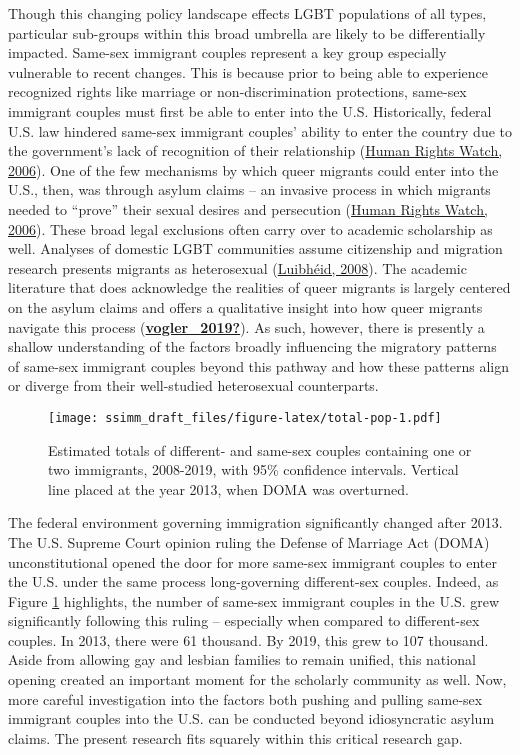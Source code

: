 \documentclass[
  11pt,
]{article}
\begin{document}
Though this changing policy landscape effects LGBT populations of all types, particular sub-groups within this broad umbrella are likely to be differentially impacted. Same-sex immigrant couples represent a key group especially vulnerable to recent changes. This is because prior to being able to experience recognized rights like marriage or non-discrimination protections, same-sex immigrant couples must first be able to enter into the U.S. Historically, federal U.S. law hindered same-sex immigrant couples' ability to enter the country due to the government's lack of recognition of their relationship (\protect\hyperlink{ref-humanrightswatch_2006}{Human Rights Watch, 2006}). One of the few mechanisms by which queer migrants could enter into the U.S., then, was through asylum claims -- an invasive process in which migrants needed to ``prove'' their sexual desires and persecution (\protect\hyperlink{ref-humanrightswatch_2006}{Human Rights Watch, 2006}). These broad legal exclusions often carry over to academic scholarship as well. Analyses of domestic LGBT communities assume citizenship and migration research presents migrants as heterosexual (\protect\hyperlink{ref-luibheid_2008}{Luibhéid, 2008}). The academic literature that does acknowledge the realities of queer migrants is largely centered on the asylum claims and offers a qualitative insight into how queer migrants navigate this process (\protect\hyperlink{ref-vogler_2019}{\textbf{vogler\_2019?}}). As such, however, there is presently a shallow understanding of the factors broadly influencing the migratory patterns of same-sex immigrant couples beyond this pathway and how these patterns align or diverge from their well-studied heterosexual counterparts.

\begin{figure}
\centering
\texttt{[image: ssimm\_draft\_files/figure-latex/total-pop-1.pdf]}
\caption{\label{fig:total-pop}Estimated totals of different- and same-sex couples containing one or two immigrants, 2008-2019, with 95\% confidence intervals. Vertical line placed at the year 2013, when DOMA was overturned.}
\end{figure}

The federal environment governing immigration significantly changed after 2013. The U.S. Supreme Court opinion ruling the Defense of Marriage Act (DOMA) unconstitutional opened the door for more same-sex immigrant couples to enter the U.S. under the same process long-governing different-sex couples. Indeed, as Figure \ref{fig:total-pop} highlights, the number of same-sex immigrant couples in the U.S. grew significantly following this ruling -- especially when compared to different-sex couples. In 2013, there were 61 thousand. By 2019, this grew to 107 thousand. Aside from allowing gay and lesbian families to remain unified, this national opening created an important moment for the scholarly community as well. Now, more careful investigation into the factors both pushing and pulling same-sex immigrant couples into the U.S. can be conducted beyond idiosyncratic asylum claims. The present research fits squarely within this critical research gap.
\end{document}
